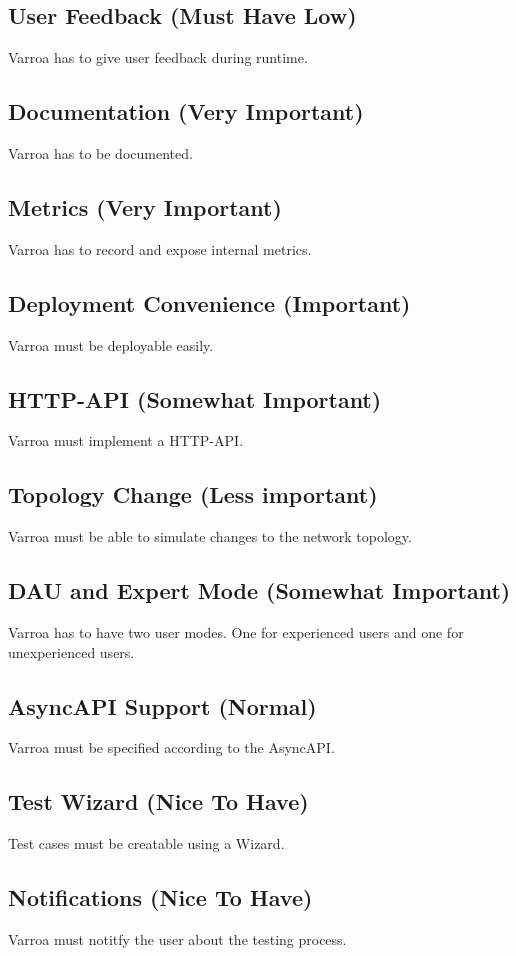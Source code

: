 \subsection{User Feedback (Must Have Low)}
Varroa has to give user feedback during runtime.

\subsection{Documentation (Very Important)}
Varroa has to be documented. 

\subsection{Metrics (Very Important)}
Varroa has to record and expose internal metrics.

\subsection{Deployment Convenience (Important)}
Varroa must be deployable easily.

\subsection{HTTP-API (Somewhat Important)}
Varroa must implement a HTTP-API.

\subsection{Topology Change (Less important)}
Varroa must be able to simulate changes to the network topology.

\subsection{DAU and Expert Mode (Somewhat Important)}
Varroa has to have two user modes.
One for experienced users and one for unexperienced users.

\subsection{AsyncAPI Support (Normal)}
Varroa must be specified according to the AsyncAPI.

\subsection{Test Wizard (Nice To Have)}
Test cases must be creatable using a Wizard.

\subsection{Notifications (Nice To Have)}
Varroa must notitfy the user about the testing process.


















